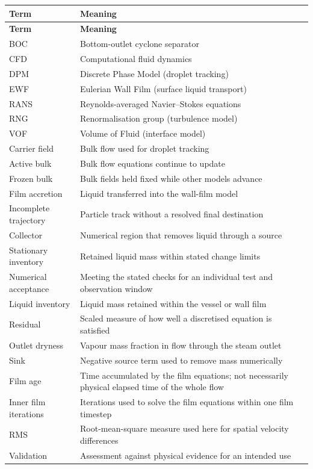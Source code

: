\addtocounter{table}{-1}
\renewcommand{\theHtable}{glossary-1}
\begin{longtable}{@{}>{\raggedright\arraybackslash}p{0.29000000\dimexpr\linewidth-2\tabcolsep\relax}>{\raggedright\arraybackslash}p{0.71000000\dimexpr\linewidth-2\tabcolsep\relax}@{}}
\toprule
\textbf{Term} & \textbf{Meaning} \\
\midrule
\endfirsthead
\toprule
\textbf{Term} & \textbf{Meaning} \\
\midrule
\endhead
BOC & Bottom-outlet cyclone separator \\
CFD & Computational fluid dynamics \\
DPM & Discrete Phase Model (droplet tracking) \\
EWF & Eulerian Wall Film (surface liquid transport) \\
RANS & Reynolds-averaged Navier--Stokes equations \\
RNG & Renormalisation group (turbulence model) \\
VOF & Volume of Fluid (interface model) \\
Carrier field & Bulk flow used for droplet tracking \\
Active bulk & Bulk flow equations continue to update \\
Frozen bulk & Bulk fields held fixed while other models advance \\
Film accretion & Liquid transferred into the wall-film model \\
Incomplete trajectory & Particle track without a resolved final destination \\
Collector & Numerical region that removes liquid through a source \\
Stationary inventory & Retained liquid mass within stated change limits \\
Numerical acceptance & Meeting the stated checks for an individual test and observation window \\
Liquid inventory & Liquid mass retained within the vessel or wall film \\
Residual & Scaled measure of how well a discretised equation is satisfied \\
Outlet dryness & Vapour mass fraction in flow through the steam outlet \\
Sink & Negative source term used to remove mass numerically \\
Film age & Time accumulated by the film equations; not necessarily physical elapsed time of the whole flow \\
Inner film iterations & Iterations used to solve the film equations within one film timestep \\
RMS & Root-mean-square measure used here for spatial velocity differences \\
Validation & Assessment against physical evidence for an intended use \\
\bottomrule
\end{longtable}
\renewcommand{\theHtable}{\arabic{table}}

